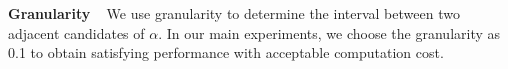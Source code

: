 \noindent\textbf{Granularity} \  
We use granularity to determine the interval between two adjacent candidates of $\alpha$. In our main experiments, we choose the granularity as 0.1 to obtain satisfying performance with acceptable computation cost.





